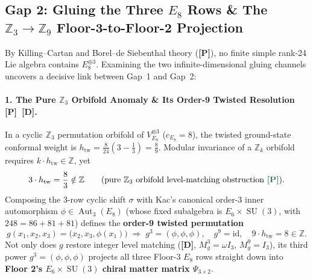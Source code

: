 \documentclass[11pt,a4paper]{article}
\newcommand{\badgeP}{\textbf{\color{sqJade}[P]}}
\newcommand{\badgeD}{\textbf{\color{sqRose}[D]}}
\theoremstyle{definition}
\begin{document}
\subsection{Gap 2: Gluing the Three $E_8$ Rows \& The $\mathbb{Z}_3\to\mathbb{Z}_9$ Floor-3-to-Floor-2 Projection}

By Killing--Cartan and Borel--de Siebenthal theory (\badgeP), no finite simple rank-24 Lie algebra contains $E_8^{\oplus 3}$. Examining the two infinite-dimensional gluing channels uncovers a decisive link between Gap~1 and Gap~2:

\paragraph{1. The Pure $\mathbb{Z}_3$ Orbifold Anomaly \& Its Order-9 Twisted Resolution \badgeP\ \badgeD.}
In a cyclic $\mathbb{Z}_3$ permutation orbifold of $V_{E_8}^{\otimes 3}$ ($c_{E_8}=8$), the twisted ground-state conformal weight is $h_{\mathrm{tw}} = \frac{8}{24}(3 - \frac{1}{3}) = \frac{8}{9}$. Modular invariance of a $\mathbb{Z}_k$ orbifold requires $k\cdot h_{\mathrm{tw}} \in \mathbb{Z}$, yet
\begin{equation}
  3 \cdot h_{\mathrm{tw}} = \frac{8}{3} \notin \mathbb{Z} \qquad (\text{pure } \mathbb{Z}_3 \text{ orbifold level-matching obstruction \badgeP}).
\end{equation}
Composing the 3-row cyclic shift $\sigma$ with Kac's canonical order-3 inner automorphism $\phi \in \operatorname{Aut}_3(E_8)$ (whose fixed subalgebra is $E_6 \times \operatorname{SU}(3)$, with $248 = 86 + 81 + 81$) defines the \textbf{order-9 twisted permutation}
\begin{equation}
  g(x_1, x_2, x_3) = \big(x_2, x_3, \phi(x_1)\big) \;\Longrightarrow\; g^3 = (\phi,\phi,\phi), \quad g^9 = \mathrm{id}, \quad 9 \cdot h_{\mathrm{tw}} = 8 \in \mathbb{Z}.
\end{equation}
Not only does $g$ restore integer level matching (\badgeD, $M_g^3 = \omega I_3$, $M_g^9 = I_3$), its third power $g^3 = (\phi,\phi,\phi)$ projects all three Floor-3 $E_8$ rows straight down into \textbf{Floor 2's $E_6\times\operatorname{SU}(3)$ chiral matter matrix $\Psi_{3\times 2}$}.
\end{document}
